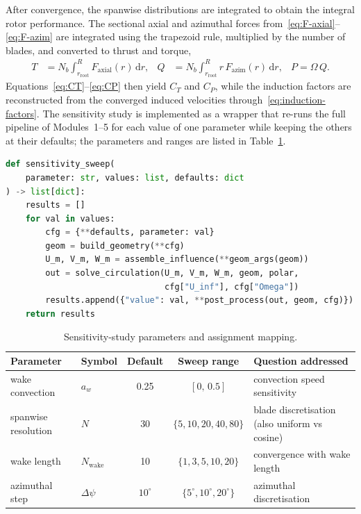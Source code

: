 After convergence, the spanwise distributions are integrated to obtain the integral rotor performance. The sectional axial and azimuthal forces from~\eqref{eq:F-axial}--\eqref{eq:F-azim} are integrated using the trapezoid rule, multiplied by the number of blades, and converted to thrust and torque,
\begin{align}
T &= N_b\int_{r_{\text{root}}}^{R} F_{\text{axial}}(r)\,\mathrm{d}r,
& Q &= N_b\int_{r_{\text{root}}}^{R} r\,F_{\text{azim}}(r)\,\mathrm{d}r,
& P = \Omega\,Q.
\label{eq:T-Q-integration}
\end{align}
Equations~\eqref{eq:CT}--\eqref{eq:CP} then yield $C_T$ and $C_P$, while the induction factors are reconstructed from the converged induced velocities through~\eqref{eq:induction-factors}. The sensitivity study is implemented as a wrapper that re-runs the full pipeline of Modules~1--5 for each value of one parameter while keeping the others at their defaults; the parameters and ranges are listed in Table~\ref{tab:sensitivity}.

\begin{lstlisting}[language=Python]
def sensitivity_sweep(
    parameter: str, values: list, defaults: dict
) -> list[dict]:
    results = []
    for val in values:
        cfg = {**defaults, parameter: val}
        geom = build_geometry(**cfg)
        U_m, V_m, W_m = assemble_influence(**geom_args(geom))
        out = solve_circulation(U_m, V_m, W_m, geom, polar,
                                cfg["U_inf"], cfg["Omega"])
        results.append({"value": val, **post_process(out, geom, cfg)})
    return results
\end{lstlisting}

\begin{table}[H]
\centering
\caption{Sensitivity-study parameters and assignment mapping.}
\label{tab:sensitivity}
\begin{tabular}{@{}llccl@{}}
\toprule
Parameter & Symbol & Default & Sweep range & Question addressed \\ \midrule
wake convection      & $a_w$            & 0.25        & $[0,\,0.5]$                         & convection speed sensitivity \\
spanwise resolution  & $N$              & 30          & $\{5,10,20,40,80\}$                 & blade discretisation (also uniform vs cosine) \\
wake length          & $N_{\text{wake}}$ & 10         & $\{1,3,5,10,20\}$                   & convergence with wake length \\
azimuthal step       & $\Delta\psi$     & $10^\circ$  & $\{5^\circ,10^\circ,20^\circ\}$     & azimuthal discretisation \\
\bottomrule
\end{tabular}
\end{table}

